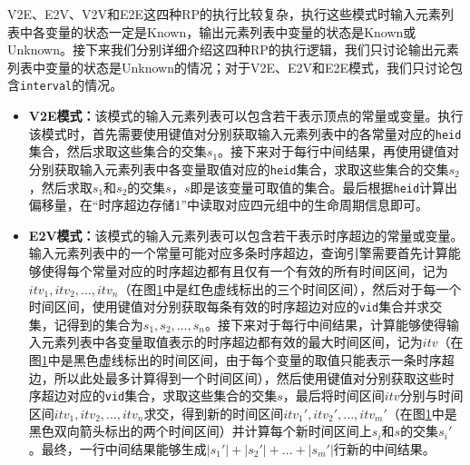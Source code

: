 V2E、E2V、V2V和E2E这四种RP的执行比较复杂，执行这些模式时输入元素列表中各变量的状态一定是Known，输出元素列表中变量的状态是Known或Unknown。接下来我们分别详细介绍这四种RP的执行逻辑，我们只讨论输出元素列表中变量的状态是Unknown的情况；对于V2E、E2V和E2E模式，我们只讨论包含\texttt{interval}的情况。
\begin{itemize}
    \item \textbf{V2E模式：}该模式的输入元素列表可以包含若干表示顶点的常量或变量。执行该模式时，首先需要使用键值对分别获取输入元素列表中的各常量对应的\texttt{heid}集合，然后求取这些集合的交集$s_1$。接下来对于每行中间结果，再使用键值对分别获取输入元素列表中各变量取值对应的\texttt{heid}集合，求取这些集合的交集$s_2$，然后求取$s_1$和$s_2$的交集$s$，$s$即是该变量可取值的集合。最后根据\texttt{heid}计算出偏移量，在“时序超边存储1”中读取对应四元组中的生命周期信息即可。
    \item \textbf{E2V模式：}该模式的输入元素列表可以包含若干表示时序超边的常量或变量。输入元素列表中的一个常量可能对应多条时序超边，查询引擎需要首先计算能够使得每个常量对应的时序超边都有且仅有一个有效的所有时间区间，记为$itv_1, itv_2,...,itv_n$（在图\ref{e2v}中是红色虚线标出的三个时间区间），然后对于每一个时间区间，使用键值对分别获取每条有效的时序超边对应的\texttt{vid}集合并求交集，记得到的集合为$s_1, s_2, ..., s_n$。接下来对于每行中间结果，计算能够使得输入元素列表中各变量取值表示的时序超边都有效的最大时间区间，记为$itv$（在图\ref{e2v}中是黑色虚线标出的时间区间，由于每个变量的取值只能表示一条时序超边，所以此处最多计算得到一个时间区间），然后使用键值对分别获取这些时序超边对应的\texttt{vid}集合，求取这些集合的交集$s$，最后将时间区间$itv$分别与时间区间$itv_1, itv_2,...,itv_n$求交，得到新的时间区间$itv_1', itv_2',...,itv_m'$（在图\ref{e2v}中是黑色双向箭头标出的两个时间区间）并计算每个新时间区间上$s_i$和$s$的交集$s_i'$。最终，一行中间结果能够生成$|s_1'|+|s_2'|+...+|s_m'|$行新的中间结果。
    
    \begin{figure}[!htb]
    \label{e2v}
    \end{figure}
    

\end{itemize}
